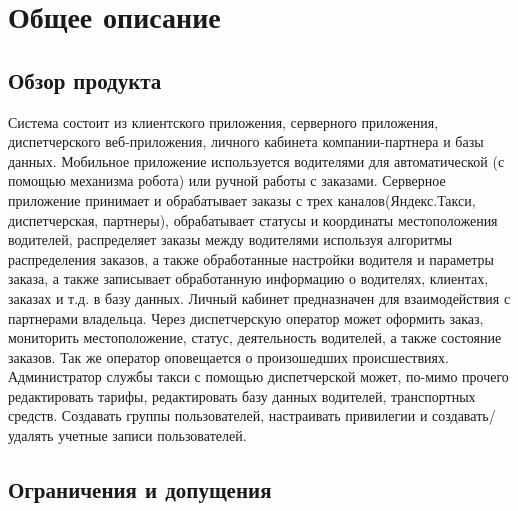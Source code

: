 \chapter{Общее описание}

		\section{Обзор продукта} 

		Система состоит из клиентского приложения, серверного приложения, диспетчерского веб-приложения, личного кабинета компании-партнера и базы данных. Мобильное приложение используется водителями для автоматической (с помощью механизма робота) или ручной работы с заказами. Серверное приложение принимает и обрабатывает заказы с трех каналов(Яндекс.Такси, диспетчерская, партнеры), обрабатывает статусы и координаты местоположения водителей, распределяет заказы между водителями используя алгоритмы распределения заказов, а также обработанные настройки водителя и параметры заказа, а также записывает обработанную информацию о водителях, клиентах, заказах и т.д. в базу данных. Личный кабинет предназначен для взаимодействия с партнерами владельца. Через диспетчерскую оператор может оформить заказ, мониторить местоположение, статус, деятельность водителей, а также состояние заказов. Так же оператор оповещается о произошедших происшествиях. Администратор службы такси с помощью диспетчерской может, по-мимо прочего редактировать тарифы, редактировать базу данных водителей, транспортных средств. Создавать группы пользователей, настраивать привилегии и создавать/удалять учетные записи пользователей. 

		\section{Ограничения и допущения}

